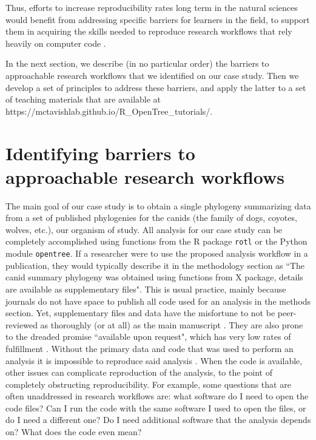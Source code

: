 \documentclass[12pt]{article}
\begin{document}
Thus, efforts to increase reproducibility rates long term in the natural sciences
would benefit from addressing specific barriers for learners in the field, to
support them in acquiring the skills needed to reproduce research workflows
that rely heavily on computer code \citep{peng2011reproducible, sandve2013ten, powers2019open}.

In the next section, we describe (in no particular order) the barriers to approachable research
workflows that we identified on our case study.
Then we develop a set of principles to address these barriers, and apply the latter
to a set of teaching materials that are available at
https://mctavishlab.github.io/R\_OpenTree\_tutorials/.


\section*{Identifying barriers to approachable research workflows}
\label{sec:identifying}


The main goal of our case study is to obtain a single phylogeny summarizing
data from a set of published phylogenies for the canids (the family of dogs, coyotes, wolves, etc.),
our organism of study.
All analysis for our case study can be completely accomplished using functions
from the R package \texttt{rotl} or the Python module \texttt{opentree}. If
a researcher were to use the proposed analysis workflow in a publication, they would typically
describe it in the methodology section as ``The canid summary phylogeny was obtained using
functions from X package, details are available as supplementary files".
This is usual practice, mainly because journals do not have space to publish
all code used for an analysis in the methods section. Yet, supplementary files and data have
the misfortune to not be peer-reviewed as thoroughly (or at all) as the main manuscript
\citep{pop2015use}.
They are also prone to the dreaded promise ``available upon request", which has
very low rates of fulfillment \citep{krawczyk2012available}.
Without the primary data and code that was used to perform an analysis it is impossible
to reproduce said analysis \citep{miyakawa2020no}. When the code is available, other issues can
complicate reproduction of the analysis, to the point of completely obstructing
reproducibility.
For example, some questions that are often unaddressed in research workflows are:
what software do I need to open the code files?
Can I run the code with the same software I used to open the files, or do I need a different one?
Do I need additional software that the analysis depends on?
What does the code even mean?
\end{document}
